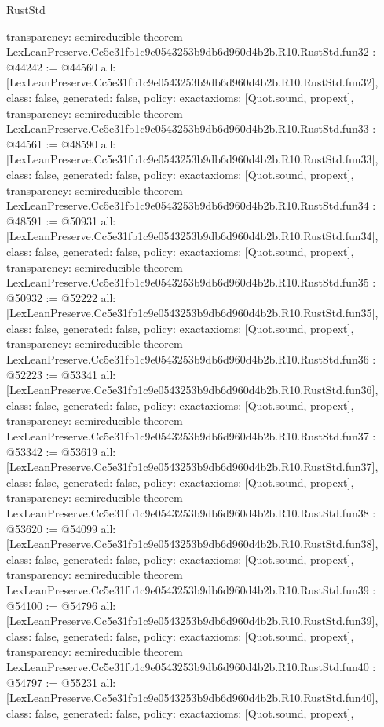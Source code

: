 \begin{lexlean}{RustStd}
\begin{coremodule}
{  transparency: semireducible
}
theorem LexLeanPreserve.Cc5e31fb1c9e0543253b9db6d960d4b2b.R10.RustStd.fun32 : @44242 := @44560 {
  all: [LexLeanPreserve.Cc5e31fb1c9e0543253b9db6d960d4b2b.R10.RustStd.fun32],
  class: false,
  generated: false,
  policy: exact{axioms: [Quot.sound, propext]},
  transparency: semireducible
}
theorem LexLeanPreserve.Cc5e31fb1c9e0543253b9db6d960d4b2b.R10.RustStd.fun33 : @44561 := @48590 {
  all: [LexLeanPreserve.Cc5e31fb1c9e0543253b9db6d960d4b2b.R10.RustStd.fun33],
  class: false,
  generated: false,
  policy: exact{axioms: [Quot.sound, propext]},
  transparency: semireducible
}
theorem LexLeanPreserve.Cc5e31fb1c9e0543253b9db6d960d4b2b.R10.RustStd.fun34 : @48591 := @50931 {
  all: [LexLeanPreserve.Cc5e31fb1c9e0543253b9db6d960d4b2b.R10.RustStd.fun34],
  class: false,
  generated: false,
  policy: exact{axioms: [Quot.sound, propext]},
  transparency: semireducible
}
theorem LexLeanPreserve.Cc5e31fb1c9e0543253b9db6d960d4b2b.R10.RustStd.fun35 : @50932 := @52222 {
  all: [LexLeanPreserve.Cc5e31fb1c9e0543253b9db6d960d4b2b.R10.RustStd.fun35],
  class: false,
  generated: false,
  policy: exact{axioms: [Quot.sound, propext]},
  transparency: semireducible
}
theorem LexLeanPreserve.Cc5e31fb1c9e0543253b9db6d960d4b2b.R10.RustStd.fun36 : @52223 := @53341 {
  all: [LexLeanPreserve.Cc5e31fb1c9e0543253b9db6d960d4b2b.R10.RustStd.fun36],
  class: false,
  generated: false,
  policy: exact{axioms: [Quot.sound, propext]},
  transparency: semireducible
}
theorem LexLeanPreserve.Cc5e31fb1c9e0543253b9db6d960d4b2b.R10.RustStd.fun37 : @53342 := @53619 {
  all: [LexLeanPreserve.Cc5e31fb1c9e0543253b9db6d960d4b2b.R10.RustStd.fun37],
  class: false,
  generated: false,
  policy: exact{axioms: [Quot.sound, propext]},
  transparency: semireducible
}
theorem LexLeanPreserve.Cc5e31fb1c9e0543253b9db6d960d4b2b.R10.RustStd.fun38 : @53620 := @54099 {
  all: [LexLeanPreserve.Cc5e31fb1c9e0543253b9db6d960d4b2b.R10.RustStd.fun38],
  class: false,
  generated: false,
  policy: exact{axioms: [Quot.sound, propext]},
  transparency: semireducible
}
theorem LexLeanPreserve.Cc5e31fb1c9e0543253b9db6d960d4b2b.R10.RustStd.fun39 : @54100 := @54796 {
  all: [LexLeanPreserve.Cc5e31fb1c9e0543253b9db6d960d4b2b.R10.RustStd.fun39],
  class: false,
  generated: false,
  policy: exact{axioms: [Quot.sound, propext]},
  transparency: semireducible
}
theorem LexLeanPreserve.Cc5e31fb1c9e0543253b9db6d960d4b2b.R10.RustStd.fun40 : @54797 := @55231 {
  all: [LexLeanPreserve.Cc5e31fb1c9e0543253b9db6d960d4b2b.R10.RustStd.fun40],
  class: false,
  generated: false,
  policy: exact{axioms: [Quot.sound, propext]},
}
\end{coremodule}
\end{lexlean}
